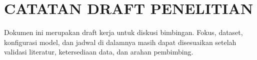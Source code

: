 \documentclass[proposal,satusetengahspasi,indonesia]{../cls/template-ta-2025}
\begin{document}
\titlepageind

\chapter*{CATATAN DRAFT PENELITIAN}

Dokumen ini merupakan draft kerja untuk diskusi bimbingan. Fokus, dataset, konfigurasi model, dan jadwal di dalamnya masih dapat disesuaikan setelah validasi literatur, ketersediaan data, dan arahan pembimbing.

\tableofcontents
\clearpage
{}







\end{document}
